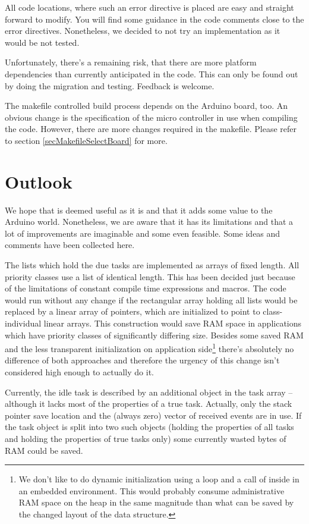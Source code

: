 All code locations, where such an error directive is placed are easy and
straight forward to modify. You will find some guidance in the code
comments close to the error directives. Nonetheless, we decided to not try
an implementation as it would be not tested.

Unfortunately, there's a remaining risk, that there are more platform
dependencies than currently anticipated in the code. This can only be
found out by doing the migration and testing. Feedback is welcome.

The makefile controlled build process depends on the Arduino board, too.
An obvious change is the specification of the micro controller in use when compiling
the code. However, there are more changes required in the makefile. Please
refer to section \ref{secMakefileSelectBoard} for more.


\chapter{Outlook}
\label{secOutlook}

We hope that \rtos{} is deemed useful as it is and that it adds some value
to the Arduino world. Nonetheless, we are aware that it has its limitations
and that a lot of improvements are imaginable and some even feasible. Some
ideas and comments have been collected here.

The lists which hold the due tasks are implemented as arrays of fixed
length. All priority classes use a list of identical length. This has been
decided just because of the limitations of constant compile time
expressions and macros. The code would run without any change if the
rectangular array holding all lists would be replaced by a linear array of
pointers, which are initialized to point to class-individual linear
arrays. This construction would save RAM space in applications which have
priority classes of significantly differing size. Besides some saved RAM
and the less transparent initialization on application side\footnote{We
don't like to do dynamic initialization using a loop and a call of
 inside in an embedded environment. This would probably
consume administrative RAM space on the heap in the same magnitude than
what can be saved by the changed layout of the \rtos{} data structure.}
there's absolutely no difference of both approaches and therefore the
urgency of this change isn't considered high enough to actually do it.

Currently, the idle task is described by an additional object in the task
array -- although it lacks most of the properties of a true task.
Actually, only the stack pointer save location and the (always zero)
vector of received events are in use. If the task object is split into two
such objects (holding the properties of all tasks and holding the
properties of true tasks only) some currently wasted bytes of RAM could be
saved.

